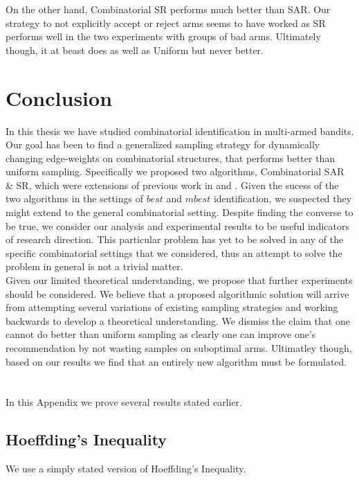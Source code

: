 \documentclass[11.75pt,oneside]{amsart}
\begin{document}
On the other hand, Combinatorial SR performs much better than SAR. Our strategy to not explicitly accept or reject arms seems to have worked as SR performs well in the two experiments with groups of bad arms. Ultimately though, it at beast does as well as Uniform but never better.\\

\section{Conclusion} \label{sec:con}
In this thesis we have studied combinatorial identification in multi-armed bandits. Our goal has been to find a generalized sampling strategy for dynamically changing edge-weights on combinatorial structures, that performs better than uniform sampling. Specifically we proposed two algorithms, Combinatorial SAR \& SR, which were extensions of previous work in \cite{ABM10} and \cite{BWV13}. Given the sucess of the two algorithms in the settings of $best$ and $mbest$ identification, we suspected they might extend to the general combinatorial setting. Despite finding the converse to be true, we consider our analysis and experimental results to be useful indicators of research direction. This particular problem has yet to be solved in any of the specific combinatorial settings that we considered, thus an attempt to solve the problem in general is not a trivial matter.\\

Given our limited theoretical understanding, we propose that further experiments should be considered. We believe that a proposed algorithmic solution will arrive from attempting several variations of existing sampling strategies and working backwards to develop a theoretical understanding. We dismiss the claim that one cannot do better than uniform sampling as clearly one can improve one's recommendation by not wasting samples on suboptimal arms. Ultimatley though, based on our results we find that an entirely new algorithm must be formulated.\\

\newpage
\appendix

\section{} \label{sec:app}
In this Appendix we prove several results stated earlier.

\subsection{Hoeffding's Inequality}
We use a simply stated version of Hoeffding's Inequality.
\end{document}
